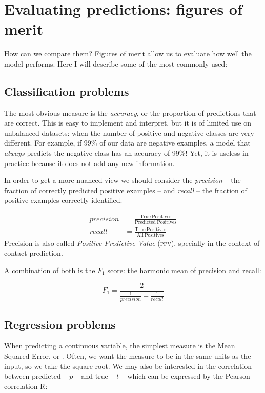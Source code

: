 \section{Evaluating predictions: figures of merit}
How can we compare them?
Figures of merit allow us to evaluate how well the model performs.
Here I will describe some of the most commonly used:

\subsection{Classification problems}
The most obvious measure is the \emph{accuracy}, or the proportion of predictions that are correct.
This is easy to implement and interpret, but it is of limited use on unbalanced datasets: when the number of positive and negative classes are very different.
For example, if 99\% of our data are negative examples, a model that \emph{always} predicts the negative class has an accuracy of 99\%!
Yet, it is useless in practice because it does not add any new information.

In order to get  a more nuanced view we should consider the \emph{precision} -- the fraction of correctly predicted positive examples -- 
and \emph{recall} -- the fraction of positive examples correctly identified.

\begin{align*}
precision &= \frac{\mathrm{True\ Positives}}{\mathrm{Predicted\ Positives}}\\
recall &= \frac{\mathrm{True\ Positives}}{\mathrm{All\ Positives}}
\end{align*}
Precision is also called \emph{Positive Predictive Value} (\textsc{ppv}), specially in the context of contact prediction.

A combination  of both is the $F_1$ score: the harmonic mean of precision and recall:

\begin{equation*}
F_1 = \frac{2}{\frac{1}{precision} + \frac{1}{recall}}
\end{equation*}

\subsection{Regression problems}
When predicting a continuous variable, the simplest measure is the Mean Squared Error, or \MSE.
Often, we want the measure to be in the same units as the input, so we take the square root.
We may also be interested in the correlation between predicted -- $p$ -- and true -- $t$ -- which can be expressed by the Pearson correlation R:

